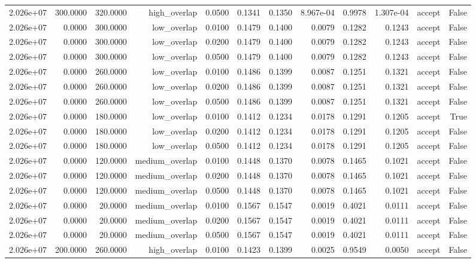 \begin{table}[t]
\begin{tabular}{lrrrrrrrrrrr}
2.026e+07 & 300.0000 & 320.0000 & high\_overlap & 0.0500 & 0.1341 & 0.1350 & 8.967e-04 & 0.9978 & 1.307e-04 & accept & False \\
2.026e+07 & 0.0000 & 300.0000 & low\_overlap & 0.0100 & 0.1479 & 0.1400 & 0.0079 & 0.1282 & 0.1243 & accept & False \\
2.026e+07 & 0.0000 & 300.0000 & low\_overlap & 0.0200 & 0.1479 & 0.1400 & 0.0079 & 0.1282 & 0.1243 & accept & False \\
2.026e+07 & 0.0000 & 300.0000 & low\_overlap & 0.0500 & 0.1479 & 0.1400 & 0.0079 & 0.1282 & 0.1243 & accept & False \\
2.026e+07 & 0.0000 & 260.0000 & low\_overlap & 0.0100 & 0.1486 & 0.1399 & 0.0087 & 0.1251 & 0.1321 & accept & False \\
2.026e+07 & 0.0000 & 260.0000 & low\_overlap & 0.0200 & 0.1486 & 0.1399 & 0.0087 & 0.1251 & 0.1321 & accept & False \\
2.026e+07 & 0.0000 & 260.0000 & low\_overlap & 0.0500 & 0.1486 & 0.1399 & 0.0087 & 0.1251 & 0.1321 & accept & False \\
2.026e+07 & 0.0000 & 180.0000 & low\_overlap & 0.0100 & 0.1412 & 0.1234 & 0.0178 & 0.1291 & 0.1205 & accept & True \\
2.026e+07 & 0.0000 & 180.0000 & low\_overlap & 0.0200 & 0.1412 & 0.1234 & 0.0178 & 0.1291 & 0.1205 & accept & False \\
2.026e+07 & 0.0000 & 180.0000 & low\_overlap & 0.0500 & 0.1412 & 0.1234 & 0.0178 & 0.1291 & 0.1205 & accept & False \\
2.026e+07 & 0.0000 & 120.0000 & medium\_overlap & 0.0100 & 0.1448 & 0.1370 & 0.0078 & 0.1465 & 0.1021 & accept & False \\
2.026e+07 & 0.0000 & 120.0000 & medium\_overlap & 0.0200 & 0.1448 & 0.1370 & 0.0078 & 0.1465 & 0.1021 & accept & False \\
2.026e+07 & 0.0000 & 120.0000 & medium\_overlap & 0.0500 & 0.1448 & 0.1370 & 0.0078 & 0.1465 & 0.1021 & accept & False \\
2.026e+07 & 0.0000 & 20.0000 & medium\_overlap & 0.0100 & 0.1567 & 0.1547 & 0.0019 & 0.4021 & 0.0111 & accept & False \\
2.026e+07 & 0.0000 & 20.0000 & medium\_overlap & 0.0200 & 0.1567 & 0.1547 & 0.0019 & 0.4021 & 0.0111 & accept & False \\
2.026e+07 & 0.0000 & 20.0000 & medium\_overlap & 0.0500 & 0.1567 & 0.1547 & 0.0019 & 0.4021 & 0.0111 & accept & False \\
2.026e+07 & 200.0000 & 260.0000 & high\_overlap & 0.0100 & 0.1423 & 0.1399 & 0.0025 & 0.9549 & 0.0050 & accept & False \\

\end{tabular}
\end{table}

